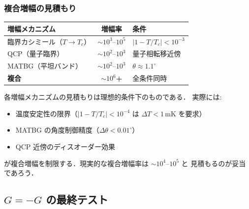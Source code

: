 \documentclass[11pt,a4paper]{article}
\begin{document}
\subsubsection{複合増幅の見積もり}

\begin{center}
\begin{tabular}{lcl}
\toprule
増幅メカニズム & 増幅率 & 条件 \\
\midrule
臨界カシミール（$T \to T_c$） & $\sim 10^3$--$10^5$ & $|1-T/T_c| < 10^{-3}$ \\
QCP（量子臨界） & $\sim 10^2$--$10^3$ & 量子相転移近傍 \\
MATBG（平坦バンド） & $\sim 10^2$--$10^3$ & $\theta \approx 1.1^\circ$ \\
\midrule
\textbf{複合} & $\sim 10^6$\textbf{+} & 全条件同時 \\
\bottomrule
\end{tabular}
\end{center}

\begin{warningbox}[$10^6$ 増幅の現実性]
各増幅メカニズムの見積もりは理想的条件下のものである．
実際には:
\begin{itemize}
\item 温度安定性の限界（$|1-T/T_c| < 10^{-4}$ は $\Delta T < 1$\,mK を要求）
\item MATBG の角度制御精度（$\Delta\theta < 0.01^\circ$）
\item QCP 近傍のディスオーダー効果
\end{itemize}
が複合増幅を制限する．現実的な複合増幅率は $\sim 10^4$--$10^5$ と
見積もるのが妥当であろう．
\end{warningbox}

\subsection{$G = -G$ の最終テスト}
\end{document}
